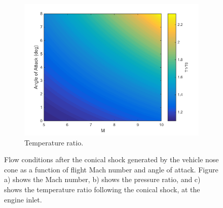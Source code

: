 \begin{figure}
\begin{subfigure}{.5\textwidth}
\includegraphics[width=0.99\linewidth]{figures/3_vehicle_design/ConicalT}
\caption{Temperature ratio.}
\label{fig:ConicalT}
\end{subfigure}
\caption{Flow conditions after the conical shock generated by the vehicle nose cone as a function of flight Mach number and angle of attack. Figure a) shows the Mach number, b) shows the pressure ratio, and c) shows the temperature ratio following the conical shock, at the engine inlet.}
\label{fig:ConicalShock}
\end{figure}

